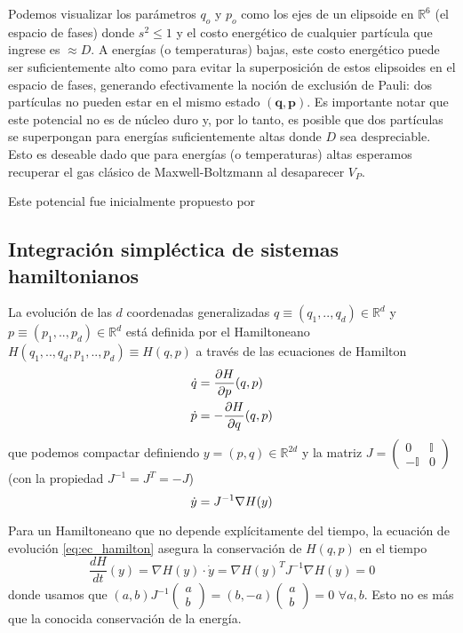 Podemos visualizar los parámetros $q_o$ y $p_o$ como los ejes de un elipsoide en $\mathbb{R}^6$ (el espacio de fases) donde $s^2 \leq 1$ y el costo energético de cualquier partícula 
que ingrese es $\approx D$.
A energías (o temperaturas) bajas, este costo energético puede ser suficientemente alto como para evitar la superposición de estos elipsoides en el espacio de fases, generando efectivamente
la noción de exclusión de Pauli: dos partículas no pueden estar en el mismo estado $(\mathbf{q}, \mathbf{p})$.
Es importante notar que este potencial no es de núcleo duro y, por lo tanto, es posible que dos partículas se superpongan para energías suficientemente altas donde $D$ sea despreciable.
Esto es deseable dado que para energías (o temperaturas) altas esperamos recuperar el gas clásico de Maxwell-Boltzmann al desaparecer $V_P$.

Este potencial fue inicialmente propuesto por 

\subsection{Integración simpléctica de sistemas hamiltonianos}

La evolución de las $d$ coordenadas generalizadas $q \equiv (q_1,..,q_d)\in\mathbb{R}^{d}$ y $p \equiv (p_1,..,p_d)\in\mathbb{R}^{d}$ está definida por el Hamiltoneano
$H(q_1,..,q_d,p_1,..,p_d) \equiv H(q,p)$  a través de las ecuaciones de Hamilton
\begin{align*}
 \dot{q} &= \frac{\partial H}{\partial p}(q,p) \\
 \dot{p} &= -\frac{\partial H}{\partial q}(q,p)
\end{align*}
que podemos compactar definiendo $y=(p,q)\in\mathbb{R}^{2d}$ y la matriz $J = \begin{pmatrix}0 & \mathbb{I} \\-\mathbb{I} & 0\end{pmatrix}$ (con la propiedad $J^{-1} = J^T = -J$)
\begin{equation}{\label{eq:ec_hamilton}}
 \dot{y} = J^{-1}\nabla H(y)
\end{equation}

Para un Hamiltoneano que no depende explícitamente del tiempo, la ecuación de evolución \ref{eq:ec_hamilton} asegura la conservación de $H(q,p)$ en el tiempo 
\[ \frac{dH}{dt}(y) = \nabla H(y)\cdot \dot{y} = \nabla H(y)^T J^{-1}\nabla H(y) = 0\]
donde usamos que $(a,b)J^{-1}\begin{pmatrix}a\\b\end{pmatrix} = (b, -a)\begin{pmatrix}a\\b\end{pmatrix} = 0$ $\forall a,b$.
Esto no es más que la conocida conservación de la energía.


